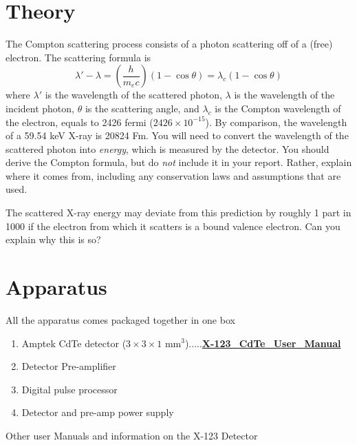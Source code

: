 \documentclass{../lab}
\begin{document}
\section{Theory}

The Compton scattering process consists of a photon scattering off of a (free) electron. The scattering formula is
\begin{equation}
    \lambda'-\lambda=\left ( \frac{h}{m_ec}\right)\left (1-\cos{\theta}\right )=\lambda_c(1-\cos{\theta})
\end{equation}
where $\lambda'$ is the wavelength of the scattered photon, $\lambda$ is the wavelength of the incident photon, $\theta$ is the scattering angle, and $\lambda_c$ is the Compton wavelength of the electron, equals to 2426 fermi ($2426 \times 10^{-15}$). By comparison, the wavelength of a 59.54 keV X-ray is 20824 Fm. You will need to convert the wavelength of the scattered photon into \emph{energy}, which is measured by the detector. You should derive the Compton formula, but do \emph{not} include it in your report. Rather, explain where it comes from, including any conservation laws and assumptions that are used.

The scattered X-ray energy may deviate from this prediction by roughly 1 part in 1000 if the electron from which it scatters is a bound valence electron. Can you explain why this is so?

\section{Apparatus}

All the apparatus comes packaged together in one box

\begin{enumerate}
    \item Amptek CdTe detector ($3 \times 3 \times 1$ mm$^{3}$).....\href{http://experimentationlab.berkeley.edu/sites/default/files/images/X-123\_CdTe\_User\_Manual.pdf}{\textbf{X-123\_CdTe\_User\_Manual}}

    \item Detector Pre-amplifier

    \item Digital pulse processor

    \item Detector and pre-amp power supply

\end{enumerate}

Other user Manuals and information on the X-123 Detector
\end{document}
